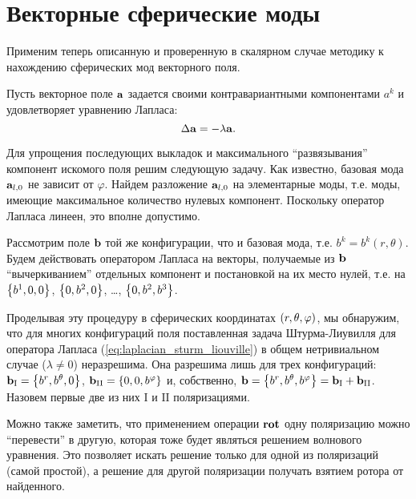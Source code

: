 \documentclass[12pt,a4paper]{article}
\begin{document}

    \section{Векторные сферические моды}

        Применим теперь описанную и проверенную в скалярном случае методику к нахождению сферических мод векторного поля.

        Пусть векторное поле $\vb{a}$ задается своими контравариантными компонентами $a^k$ и удовлетворяет уравнению Лапласа:
        \begin{equation}\label{eq:laplacian_sturm_liouville}
            \Delta \vb{a} = - \lambda \vb{a} .
        \end{equation}

        Для упрощения последующих выкладок и максимального \enquote{развязывания} компонент искомого поля решим следующую задачу. Как известно, базовая мода $\vb{a}_{l,0}$ не зависит от $\varphi$. Найдем разложение $\vb{a}_{l,0}$ на элементарные моды, т.е. моды, имеющие максимальное количество нулевых компонент. Поскольку оператор Лапласа линеен, это вполне допустимо.

        Рассмотрим поле $\vb{b}$ той же конфигурации, что и базовая мода, т.е. $b^k = b^k(r,\theta)$. Будем действовать оператором Лапласа на векторы, получаемые из $\vb{b}$ \enquote{вычеркиванием} отдельных компонент и постановкой на их место нулей, т.е. на $\qty{ b^1, 0, 0 }$, $\qty{ 0, b^2, 0 }$, \dots, $\qty{ 0, b^2, b^3 }$.

        Проделывая эту процедуру в сферических координатах $\qty(r, \theta, \varphi)$, мы обнаружим, что для многих конфигураций поля поставленная задача Штурма-Лиувилля для оператора Лапласа (\autoref{eq:laplacian_sturm_liouville}) в общем нетривиальном случае ($\lambda \neq 0$) неразрешима. Она разрешима лишь для трех конфигураций: $\vb{b}_{\mathrm{I}} = \qty{ b^r, b^\theta, 0 }$, $\vb{b}_{\mathrm{II}} = \qty{ 0, 0, b^\varphi }$ и, собственно, $\vb{b} = \qty{ b^r, b^\theta, b^\varphi } = \vb{b}_{\mathrm{I}} + \vb{b}_{\mathrm{II}}$. Назовем первые две из них $\mathrm{I}$ и $\mathrm{II}$ поляризациями.

        Можно также заметить, что применением операции $\operatorname{\mathbf{rot}}$ одну поляризацию можно \enquote{перевести} в другую, которая тоже будет являться решением волнового уравнения. Это позволяет искать решение только для одной из поляризаций (самой простой), а решение для другой поляризации получать взятием ротора от найденного.
\end{document}

